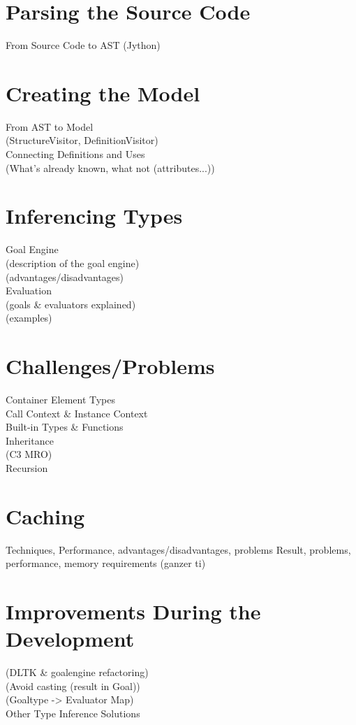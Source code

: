 \documentclass[12pt,halfparskip]{scrreprt}
\begin{document}
\section{Parsing the Source Code}
 From Source Code to AST (Jython)

\section{Creating the Model}
From AST to Model \\
(StructureVisitor, DefinitionVisitor)\\
Connecting Definitions and Uses\\
(What's already known, what not (attributes...))\\


\section{Inferencing Types}
Goal Engine \\
 (description of the goal engine)\\
 (advantages/disadvantages)\\
Evaluation\\
 (goals \& evaluators explained)\\
 (examples)\\


\section{Challenges/Problems}
Container Element Types \\
Call Context \& Instance Context \\
Built-in Types \& Functions\\
Inheritance\\
 (C3 MRO)\\
Recursion\\

\section{Caching}
 Techniques, Performance, advantages/disadvantages, problems
 Result, problems, performance, memory requirements (ganzer ti)
\section{Improvements During the Development}
 (DLTK \& goalengine refactoring) \\
 (Avoid casting (result in Goal))\\
 (Goaltype -> Evaluator Map)\\
Other Type Inference Solutions\\
\end{document}
